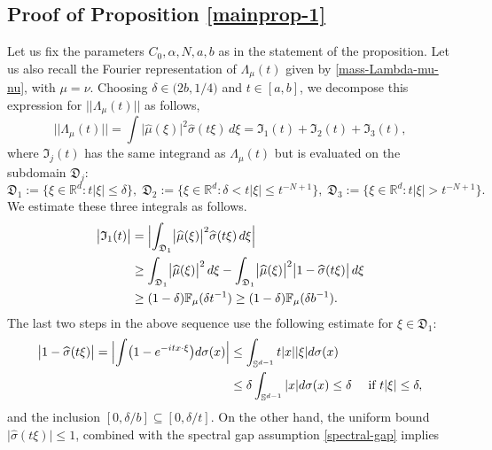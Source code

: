 \documentclass[a4paper,11pt]{amsart}
\numberwithin{equation}{section}
\begin{document}
\subsection{Proof of Proposition \ref{mainprop-1}}  
Let us fix the parameters $C_0, \alpha, N, a, b$ as in the statement of the proposition. Let us also recall the Fourier representation of $\Lambda_{\mu}(t)$ given by \eqref{mass-Lambda-mu-nu}, with $\mu = \nu$. Choosing $\delta \in \bigl(2b, {1}/{4} \bigr)$ and $t \in [a, b]$, we decompose this expression for $||\Lambda_{\mu}(t)||$ as follows, 
\begin{equation} \label{Lambda-decomp} 
||\Lambda_{\mu}(t)|| = \int \bigl| \widehat{\mu}(\xi) \bigr|^2 \widehat{\sigma}(t \xi) \, d \xi = \mathfrak I_1(t) + \mathfrak I_2(t) + \mathfrak I_3(t), \end{equation} 
where $\mathfrak I_j(t)$ has the same integrand as $\Lambda_{\mu}(t)$ but is evaluated on the subdomain $\mathfrak D_j$: 
\[ \mathfrak D_1 := \bigl\{ \xi \in \mathbb R^d: t|\xi| \leq \delta \}, \; \mathfrak D_2 := \bigl\{ \xi \in \mathbb R^d: \delta < t|\xi| \leq t^{-N+1} \}, \; \mathfrak D_3 := \bigl\{ \xi \in \mathbb R^d: t|\xi| > t^{-N+1} \}. \] 
We estimate these three integrals as follows.
\begin{align} 
\bigl| \mathfrak I_1(t) \bigr| &= \Bigl| \int_{\mathfrak D_1} \bigl| \widehat{\mu}(\xi) \bigr|^2 \widehat{\sigma}(t \xi) \, d \xi \Bigr| \nonumber \\ 
&\geq \int_{\mathfrak D_1} \bigl| \widehat{\mu}(\xi) \bigr|^2 \, d \xi - \int_{\mathfrak D_1} \bigl| \widehat{\mu}(\xi) \bigr|^2 \bigl|1 - \widehat{\sigma}(t \xi)\bigr| \, d \xi \nonumber \\
&\geq \mathbb (1 - \delta) \mathbb F_{\mu}(\delta t^{-1}) \geq \mathbb (1 - \delta) \mathbb F_{\mu}(\delta b^{-1}). \label{I1-est}
\end{align}
The last two steps in the above sequence use the following estimate for $\xi \in \mathfrak D_1$: 
\begin{align} 
\bigl| 1 - \widehat{\sigma}(t\xi)\bigr| = \Bigl| \int \bigl(1 - e^{-itx \cdot \xi} \bigr) d\sigma(x) \Bigr| &\leq \int_{\mathbb S^{d-1}} t |x||\xi| d\sigma(x)  \nonumber \\ 
&\leq \delta \int_{\mathbb S^{d-1}} |x| d\sigma(x)  \leq \delta \quad \text{ if }  t|\xi| \leq \delta,  \label{sigma-hat-bound}
\end{align}  
and the inclusion $[0, \delta/b] \subseteq [0, \delta/t]$. On the other hand, the uniform bound $\bigl| \widehat{\sigma}(t \xi )\bigr| \leq 1$, combined with the spectral gap assumption \eqref{spectral-gap}  implies 
\end{document}
